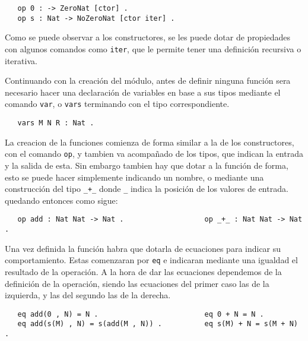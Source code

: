 {\codesize
\begin{verbatim}
   op 0 : -> ZeroNat [ctor] .
   op s : Nat -> NoZeroNat [ctor iter] .
\end{verbatim}
}

Como se puede observar a los constructores, se les puede dotar de propiedades con algunos comandos como \texttt{iter}, que le permite tener una definición recursiva o iterativa.
 \par

Continuando con la creación del módulo, antes de definir ninguna función sera necesario hacer una declaración de variables en base a sus tipos mediante el comando \texttt{var}, o \texttt{vars} terminando con el tipo correspondiente. \par

{\codesize
\begin{verbatim}
   vars M N R : Nat .
\end{verbatim}
}

La creacion de la funciones comienza de forma similar a la de los constructores, con el comando \texttt{op}, y tambien va acompañado de los tipos, que indican la entrada y la salida de esta. Sin embargo tambien hay que dotar a la función de forma, esto se puede hacer simplemente indicando un nombre, o mediante una construcción del tipo \verb"_+_" donde \verb"_" indica la posición de los valores de entrada. quedando entonces como sigue: \par

{\codesize
\begin{verbatim}
   op add : Nat Nat -> Nat .                   op _+_ : Nat Nat -> Nat .
\end{verbatim}
}

Una vez definida la función habra que dotarla de ecuaciones para indicar su comportamiento. Estas comenzaran por \texttt{eq} e indicaran mediante una igualdad el resultado de la operación. A la hora de dar las ecuaciones dependemos de la definición de la operación, siendo las ecuaciones del primer caso las de la izquierda, y las del segundo las de la derecha. \par
{\codesize
\begin{verbatim}
   eq add(0 , N) = N .                         eq 0 + N = N .
   eq add(s(M) , N) = s(add(M , N)) .          eq s(M) + N = s(M + N) .
\end{verbatim}
}

